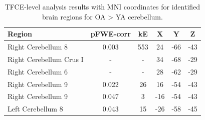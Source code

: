 \documentclass[a4paper,fleqn]{cas-sc}
\begin{document}
\begin{table}[h!]
\centering
\begin{tabular}{|l|c|c|c|c|c|}
\hline
\rowcolor[HTML]{D0D0D0} 
\textbf{Region}              & \textbf{pFWE-corr} & \textbf{kE} & \textbf{X} & \textbf{Y} & \textbf{Z} \\ \hline
Right Cerebellum 8           & 0.003             & 553         & 24         & -66        & -43        \\ 
Right Cerebellum Crus I      & -                 & -           & 34         & -68        & -29        \\ 
Right Cerebellum 6           & -                 & -           & 28         & -62        & -29        \\ 
Right Cerebellum 9           & 0.022             & 26          & 16         & -54        & -43        \\ 
Right Cerebellum 9           & 0.047             & 3           & -16        & -54        & -43        \\ 
Left Cerebellum 8            & 0.043             & 15          & -26        & -58        & -45        \\ \hline
\end{tabular}
\caption{TFCE-level analysis results with MNI coordinates for identified brain regions for OA > YA cerebellum.}
\label{tab:tfce_oaya_cerebellum}
\end{table}
\end{document}
